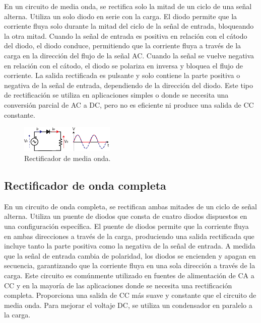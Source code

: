 \documentclass[isoft]{ssltexposter}
\begin{document}
\begin{poster}
En un circuito de media onda, se rectifica solo la mitad de un ciclo de una señal alterna.  Utiliza un solo diodo en serie con la carga. El diodo permite que la corriente fluya solo durante la mitad del ciclo de la señal de entrada, bloqueando la otra mitad.
Cuando la señal de entrada es positiva en relación con el cátodo del diodo, el diodo conduce, permitiendo que la corriente fluya a través de la carga en la dirección del flujo de la señal AC. Cuando la señal se vuelve negativa en relación con el cátodo, el diodo se polariza en inversa y bloquea el flujo de corriente.
La salida rectificada es pulsante y solo contiene la parte positiva o negativa de la señal de entrada, dependiendo de la dirección del diodo.
Este tipo de rectificación se utiliza en aplicaciones simples o donde se necesita una conversión parcial de AC a DC, pero no es eficiente ni produce una salida de CC constante.

\begin{figure}
    \centering
    \includegraphics[width=0.4\textwidth]{imagenes/rectificador_media_onda.eps}
    \caption{Rectificador de media onda.}
    \label{fig:rectificador_media_onda}
\end{figure}



\subsection{Rectificador de onda completa}

En un circuito de onda completa, se rectifican ambas mitades de un ciclo de señal alterna.
Utiliza un puente de diodos que consta de cuatro diodos dispuestos en una configuración específica.
El puente de diodos permite que la corriente fluya en ambas direcciones a través de la carga, produciendo una salida rectificada que incluye tanto la parte positiva como la negativa de la señal de entrada.
A medida que la señal de entrada cambia de polaridad, los diodos se encienden y apagan en secuencia, garantizando que la corriente fluya en una sola dirección a través de la carga.
Este circuito es comúnmente utilizado en fuentes de alimentación de CA a CC y en la mayoría de las aplicaciones donde se necesita una rectificación completa. Proporciona una salida de CC más suave y constante que el circuito de media onda. Para mejorar el voltaje DC, se utiliza un condensador en paralelo a la carga.


\end{poster}
\end{document}
